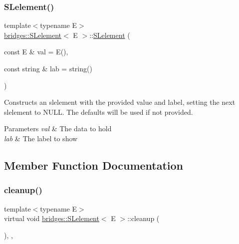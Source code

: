 \subsubsection{\texorpdfstring{S\+Lelement()}{SLelement()}\hspace{0.1cm}{\footnotesize\ttfamily [2/2]}}
{\footnotesize\ttfamily template$<$typename E$>$ \\
\mbox{\hyperlink{classbridges_1_1_s_lelement}{bridges\+::\+S\+Lelement}}$<$ E $>$\+::\mbox{\hyperlink{classbridges_1_1_s_lelement}{S\+Lelement}} (\begin{DoxyParamCaption}\item[{const E \&}]{val = {\ttfamily E()},  }\item[{const string \&}]{lab = {\ttfamily string()} }\end{DoxyParamCaption})\hspace{0.3cm}{\ttfamily [inline]}}

Constructs an slelement with the provided value and label, setting the next slelement to N\+U\+LL. The defaults will be used if not provided.


\begin{DoxyParams}{Parameters}
{\em val} & The data to hold \\
\hline
{\em lab} & The label to show \\
\hline
\end{DoxyParams}


\subsection{Member Function Documentation}
\mbox{\label{classbridges_1_1_s_lelement_ac747648849874407e9d907bb4557dd52}} 
\subsubsection{\texorpdfstring{cleanup()}{cleanup()}}
{\footnotesize\ttfamily template$<$typename E$>$ \\
virtual void \mbox{\hyperlink{classbridges_1_1_s_lelement}{bridges\+::\+S\+Lelement}}$<$ E $>$\+::cleanup (\begin{DoxyParamCaption}{ }\end{DoxyParamCaption})\hspace{0.3cm}{\ttfamily [inline]}, {\ttfamily [override]}, {\ttfamily [virtual]}}

